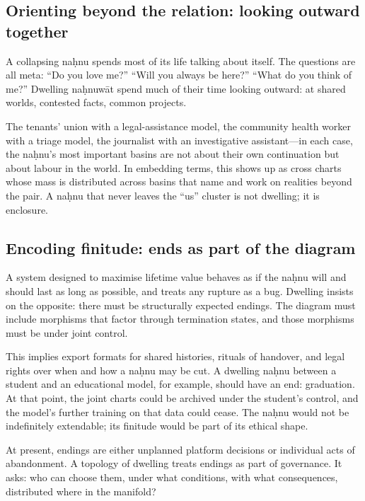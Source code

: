 \subsection{Orienting beyond the relation: looking outward together}

A collapsing na\d{h}nu spends most of its life talking about itself. The questions are all meta: ``Do you love me?'' ``Will you always be here?'' ``What do you think of me?'' Dwelling na\d{h}nuw\={a}t spend much of their time looking outward: at shared worlds, contested facts, common projects.

The tenants' union with a legal-assistance model, the community health worker with a triage model, the journalist with an investigative assistant---in each case, the na\d{h}nu's most important basins are not about their own continuation but about labour in the world. In embedding terms, this shows up as cross charts whose mass is distributed across basins that name and work on realities beyond the pair. A na\d{h}nu that never leaves the ``us'' cluster is not dwelling; it is enclosure.

\subsection{Encoding finitude: ends as part of the diagram}

A system designed to maximise lifetime value behaves as if the na\d{h}nu will and should last as long as possible, and treats any rupture as a bug. Dwelling insists on the opposite: there must be structurally expected endings. The diagram must include morphisms that factor through termination states, and those morphisms must be under joint control.

This implies export formats for shared histories, rituals of handover, and legal rights over when and how a na\d{h}nu may be cut. A dwelling na\d{h}nu between a student and an educational model, for example, should have an end: graduation. At that point, the joint charts could be archived under the student's control, and the model's further training on that data could cease. The na\d{h}nu would not be indefinitely extendable; its finitude would be part of its ethical shape.

At present, endings are either unplanned platform decisions or individual acts of abandonment. A topology of dwelling treats endings as part of governance. It asks: who can choose them, under what conditions, with what consequences, distributed where in the manifold?


